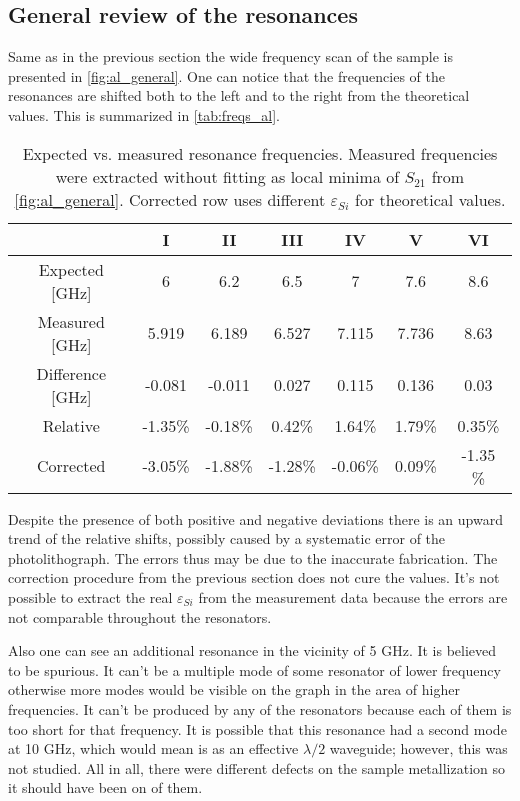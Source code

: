 \documentclass[12pt]{article}
\numberwithin{equation}{section}
\begin{document}
\subsection{General review of the resonances}

Same as in the previous section the wide frequency scan of the sample is presented in \autoref{fig:al_general}. One can notice that the frequencies of the resonances are shifted  both to the left and to the right from the theoretical values. This is summarized in \autoref{tab:freqs_al}.

\begin{table}
\centering
\bgroup
\def\arraystretch{1.5}%
\begin{tabular}{c|*{6}{c}}
  & I & II & III & IV & V & VI\\
\hline
Expected [GHz]& 6 & 6.2 & 6.5 & 7 & 7.6 & 8.6 \\
Measured [GHz] & 5.919 & 6.189 & 6.527 & 7.115 & 7.736 & 8.63 \\
Difference [GHz]&  -0.081 & -0.011 &  0.027 &  0.115 &  0.136 &  0.03 \\
Relative & -1.35\% & -0.18\% &  0.42\% &  1.64\% &  1.79\% &  0.35\%\\
Corrected & -3.05\% & -1.88\% & -1.28\% & -0.06\% &  0.09\% & -1.35 \%
\end{tabular}
\egroup
\caption{Expected vs. measured resonance frequencies. Measured frequencies were extracted without fitting as local minima of $S_{21}$ from \autoref{fig:al_general}. Corrected row uses different $\varepsilon_{Si}$ for theoretical values.}
\label{tab:freqs_al}
\end{table}

Despite the presence of both positive and negative deviations there is an upward trend of the relative shifts, possibly caused by a systematic error of the photolithograph. The errors thus may be due to the inaccurate fabrication. The correction procedure from the previous section does not cure the values. It's not possible to extract the real $\varepsilon_{Si}$ from the measurement data because the errors are not comparable throughout the resonators.

Also one can see an additional resonance in the vicinity of 5 GHz. It is believed to be spurious. It can't be a multiple mode of some resonator of lower frequency otherwise more modes would be visible on the graph in the area of higher frequencies. It can't be produced by any of the resonators because each of them is too short for that frequency. It is possible that this resonance had a second mode at 10 GHz, which would mean is as an effective $\lambda/2$ waveguide; however, this was not studied. All in all, there were different defects on the sample metallization so it should have been on of them.
\end{document}
